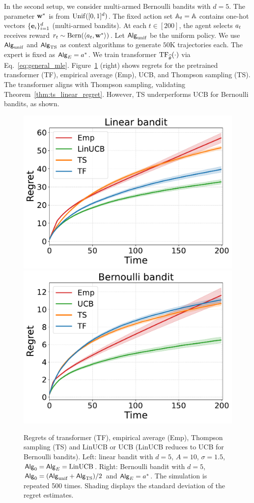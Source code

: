 In the second setup, we consider multi-armed Bernoulli bandits with $d = 5$. The parameter ${\mathbf w}^*$ is from ${\rm Unif}([0,1]^d)$. The fixed action set ${\mathbb{A}}_t={\mathbb{A}}$ contains one-hot vectors $\{{\mathbf e}_i\}_{i=1}^d$ (multi-armed bandits). At each $t \in [200]$, the agent selects ${a}_t$ receives reward $r_t \sim {\rm Bern}(\left\langle{a}_t,{\mathbf w}^*\right\rangle)$. Let ${\mathsf{Alg}}_{\mathrm{unif}}$ be the uniform policy. We use ${\mathsf{Alg}}_{\mathrm{unif}}$ and ${\mathsf{Alg}}_{\mathrm{TS}}$ as context algorithms to generate $50$K trajectories each. The expert is fixed as ${\mathsf{Alg}}_{E}={a}^*$. We train transformer ${\rm TF}_{\widehat{\theta}}(\cdot)$ via Eq.~\eqref{eq:general_mle}. Figure~\ref{fig:regret_1} (right) shows regrets for the pretrained transformer (TF), empirical average (Emp), UCB, and Thompson sampling (TS).  The transformer aligns with Thompson sampling, validating Theorem~\ref{thm:ts_linear_regret}. However, TS underperforms UCB for Bernoulli bandits, as shown.





\begin{figure}[t]
\centering  %
\includegraphics[width=0.35\linewidth]{Sections/figs/record_2_cum_True.pdf}
\hspace{2em}
\includegraphics[width=0.35\linewidth]{Sections/figs/record_1_cum_True.pdf}
\vspace{-1em}
\caption{Regrets of transformer (TF), empirical average (Emp), Thompson sampling (TS) and LinUCB or UCB (LinUCB reduces to UCB for Bernoulli bandits). Left: linear bandit with $d=5$, $A=10$, $\sigma=1.5$, ${\mathsf{Alg}}_0={\mathsf{Alg}}_{E}={\mathrm{LinUCB}}$. Right: Bernoulli bandit with $d=5$, ${\mathsf{Alg}}_0=({\mathsf{Alg}}_{\mathrm{unif}}+{\mathsf{Alg}}_{{\mathrm{TS}}})/2$ and ${\mathsf{Alg}}_{E}={a}^*$. The simulation is repeated 500 times. Shading displays the standard deviation of the regret estimates. }
\label{fig:regret_1}
\end{figure}

